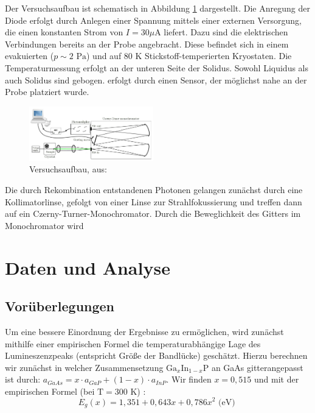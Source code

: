 \documentclass[aps,twocolumn,secnumarabic,nobalancelastpage,amsmath,amssymb,
nofootinbib,superscriptaddress]{revtex4-1}
\begin{document}
\noindent Der Versuchsaufbau ist schematisch in Abbildung \ref{fig:versuch} dargestellt. Die Anregung der Diode erfolgt durch Anlegen einer
Spannung mittels einer externen Versorgung, die einen konstanten Strom von $I=30\text{$\mu$A}$ liefert. Dazu sind die elektrischen Verbindungen bereits an der Probe angebracht.
Diese befindet sich in einem evakuierten ($p\sim 2\text{ Pa}$) und auf $80\text{ K}$ Stickstoff-temperierten Kryostaten. Die Temperaturmessung erfolgt an der unteren Seite der
Solidus. Sowohl Liquidus als auch Solidus sind gebogen.
erfolgt durch einen Sensor, der möglichst nahe an der Probe platziert wurde.

\begin{figure}[h]
  \centering
  \includegraphics[width=0.48\textwidth]{img/versuchsanleitung.jpg}
  \caption{Versuchsaufbau, aus: \cite{anleitung}}
  \label{fig:versuch}
\end{figure}

\noindent Die durch Rekombination entstandenen Photonen gelangen zunächst durch eine Kollimatorlinse, gefolgt von einer Linse zur
Strahlfokussierung und treffen dann auf ein Czerny-Turner-Monochromator. Durch die Beweglichkeit des Gitters im Monochromator wird



\section{Daten und Analyse}
\subsection{Vorüberlegungen}

\noindent Um eine bessere Einordnung der Ergebnisse zu ermöglichen, wird zunächst mithilfe einer empirischen
Formel die temperaturabhängige Lage des Lumineszenzpeaks (entspricht Größe der Bandlücke) geschätzt.
Hierzu berechnen wir zunächst in welcher Zusammensetzung $\text{Ga}_x\text{In}_{1-x}\text{P}$
an GaAs gitterangepasst ist durch: $a_{GaAs} = x\cdot a_{GaP}+(1-x)\cdot a_{InP}$. Wir finden
$x=0,515$ und mit der empirischen Formel (bei $\text{T}=300\text{ K}$) \cite{vorbereitung}:
\begin{equation}
  E_{g}(x) = 1,351+0,643x+0,786x^2\text{ (eV) }
   \label{eq:Ex}
\end{equation}
\end{document}
